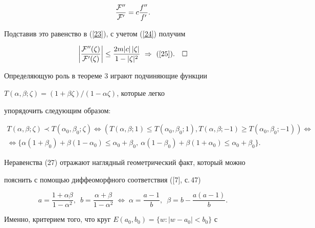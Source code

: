 $$


\frac{{\cal F}''}{{\cal F}'}= c\frac{f''}{f'}.


$$


Подставив это равенство в (\ref{23}), с учетом (\ref{24}) получим


$$


\bigg|\frac{{\cal F}''(\zeta)}{{\cal


F}'(\zeta)}\bigg|\leq \frac{2m|c|\,|\zeta|}{1-|\zeta|^2}\ \Rightarrow


\ \text{(\ref{25})}.\quad\square


$$





Определяющую роль в теореме 3 играют подчиняющие функции 


$T(\alpha,\beta;\zeta)=(1+\beta\zeta)/(1-\alpha\zeta)$, которые легко 


упорядочить следующим образом: 


\begin{multline} 


T(\alpha,\beta;\zeta)\prec T(\alpha_0,\beta_0;\zeta) \Leftrightarrow 


(T(\alpha,\beta;1)\le T(\alpha_0,\beta_0;1), 


T(\alpha,\beta;-1)\ge T(\alpha_0,\beta_0;-1)) \Leftrightarrow \\ 


\Leftrightarrow\{\alpha(1+\beta_0)+\beta(1-\alpha_0)\le 


\alpha_0+\beta_0,\ \alpha(1-\beta_0)+\beta(1+\alpha_0)\le 


\alpha_0+\beta_0\}.


\end{multline} 


Неравенства (27) отражают наглядный геометрический факт, который можно 


пояснить с помощью диффеоморфного соответствия ([7], с.\,47) 


\begin{equation} 


a=\frac{1+\alpha\beta}{1-\alpha^2},\ \; 


b=\frac{\alpha+\beta}{1-\alpha^2}\; \Leftrightarrow\; 


\alpha=\frac{a-1}{b},\ \; \beta=b-\frac{a(a-1)}{b}. 


\end{equation} 


Именно, критерием того, что круг $E(a_0,b_0)=\{w:|w-a_0|<b_0\}$ с 


